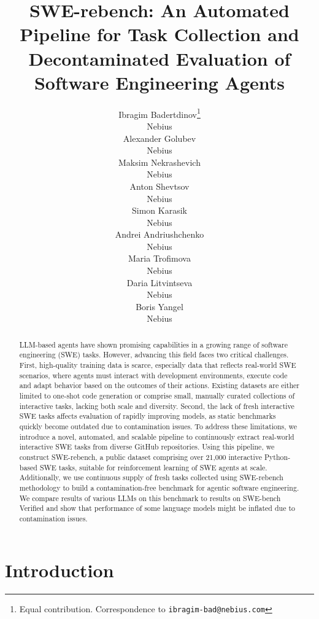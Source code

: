 \documentclass[dandb]{article}
\title{SWE-rebench: An Automated Pipeline for Task Collection and Decontaminated Evaluation of Software Engineering Agents}
\author{%
  Ibragim Badertdinov\thanks{Equal contribution. Correspondence to \texttt{ibragim-bad@nebius.com}} \\
  Nebius \\
  \And
  Alexander Golubev\footnotemark[1] \\
  Nebius \\
  \AND
  Maksim Nekrashevich \\
  Nebius \\
  \And
  Anton Shevtsov \\
  Nebius \\
  \And
  Simon Karasik \\
  Nebius \\
  \And
  Andrei Andriushchenko \\
  Nebius \\
  \And
  Maria Trofimova \\
  Nebius \\
  \And
  Daria Litvintseva \\ 
  Nebius \\
  \And
  Boris Yangel \\
  Nebius \\
}
\begin{document}
\maketitle


\begin{abstract}
LLM-based agents have shown promising capabilities in a growing range of software engineering (SWE) tasks. However, advancing this field faces two critical challenges. First, high-quality training data is scarce, especially data that reflects real-world SWE scenarios, where agents must interact with development environments, execute code and adapt behavior based on the outcomes of their actions. Existing datasets are either limited to one-shot code generation or comprise small, manually curated collections of interactive tasks, lacking both scale and diversity. Second, the lack of fresh interactive SWE tasks affects evaluation of rapidly improving models, as static benchmarks quickly become outdated due to contamination issues. To address these limitations, we introduce a novel, automated, and scalable pipeline to continuously extract real-world interactive SWE tasks from diverse GitHub repositories. Using this pipeline, we construct SWE-rebench, a public dataset comprising over 21,000 interactive Python-based SWE tasks, suitable for reinforcement learning of SWE agents at scale. Additionally, we use continuous supply of fresh tasks collected using SWE-rebench methodology to build a contamination-free benchmark for agentic software engineering. We compare results of various LLMs on this benchmark to results on SWE-bench Verified and show that performance of some language models might be inflated due to contamination issues.
\end{abstract}

\section{Introduction}
\end{document}

